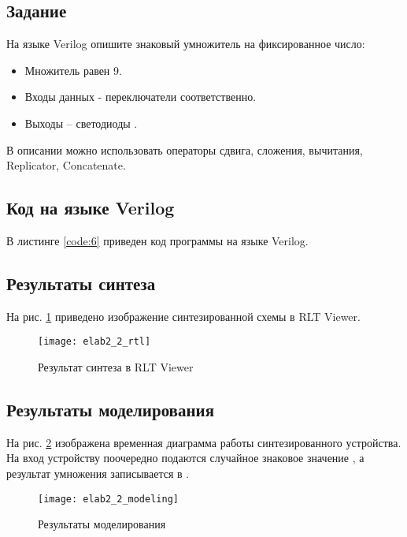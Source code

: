 \subsection{Задание}

\noindent На языке Verilog опишите знаковый умножитель на фиксированное число:
\begin{itemize}
	\item Множитель равен 9.
	\item Входы данных - переключатели  соответственно.
	\item Выходы – светодиоды .
\end{itemize}

\noindent В описании можно использовать операторы сдвига, сложения, вычитания, Replicator, Concatenate.

\subsection{Код на языке Verilog}

В листинге \ref{code:6} приведен код программы на языке Verilog.



\subsection{Результаты синтеза}

На рис. \ref{fig:elab2_2_rtl} приведено изображение синтезированной схемы в RLT Viewer.

\begin{figure}[H]
\begin{center}
	\texttt{[image: elab2\_2\_rtl]}
	\caption{Результат синтеза в RLT Viewer}
	\label{fig:elab2_2_rtl}
\end{center}
\end{figure}

\subsection{Результаты моделирования}
\label{sec:elab2_2_modeling}

На рис. \ref{fig:elab2_2_modeling} изображена временная диаграмма работы синтезированного устройства. На вход устройству поочередно подаются случайное знаковое значение , а результат умножения записывается в .

\begin{figure}[H]
\begin{center}
	\texttt{[image: elab2\_2\_modeling]}
	\caption{Результаты моделирования}
	\label{fig:elab2_2_modeling}
\end{center}
\end{figure}


